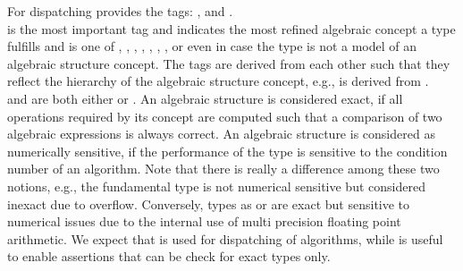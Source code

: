 
For dispatching  provides the tags:  
,  and . \\ 
 is the most important tag and indicates the most 
refined algebraic concept a type fulfills and is one of 
, , 
, , , 
, , 
 or even  
in case the type is not a model of an algebraic structure concept. 
The tags are derived 
from each other such that they reflect the hierarchy of the algebraic 
structure concept,  e.g.,  is derived from 
. \\
 and  are both either  
or .
An algebraic structure is considered exact,
if all operations required by its concept are computed such that a comparison 
of two algebraic expressions is always correct.
An algebraic structure is  considered as numerically sensitive,
if the performance of the type is sensitive to the condition number of an 
algorithm.
Note that there is really a difference among these two notions, e.g., the fundamental type  
is not numerical sensitive but considered inexact due to overflow. 
Conversely, types as  or  are exact but sensitive 
to numerical issues due to the internal use of multi precision floating point 
arithmetic. We expect that  is used for dispatching
 of algorithms, while  is useful to enable assertions that can be 
check for exact types only.

